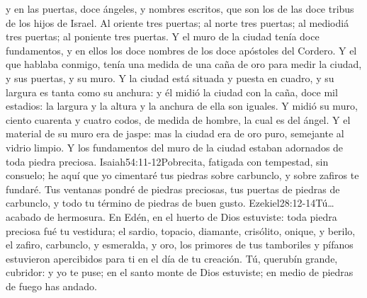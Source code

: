  y en las puertas, doce ángeles,%
 y nombres escritos, que son los de las doce tribus de los hijos de Israel.%
Al oriente tres puertas; al norte tres puertas; al mediodiá tres puertas; al poniente tres puertas.
Y el muro de la ciudad tenía doce fundamentos, y en ellos los doce nombres de los doce apóstoles del Cordero. 
Y el que hablaba conmigo, tenía una medida de una caña de oro para medir la ciudad, y sus puertas, y su muro.%
Y la ciudad está situada y puesta en cuadro, y su largura es tanta como su anchura:%
 y él midió la ciudad con la caña, doce mil estadios: la largura y la altura y la anchura de ella son iguales.%
Y midió su muro, ciento cuarenta y cuatro codos, de medida de hombre, la cual es del ángel. 
Y el material de su muro era de jaspe: mas la ciudad era de oro puro, semejante al vidrio limpio. 
Y los fundamentos del muro de la ciudad estaban adornados de toda piedra preciosa.%
				{Isaiah}{54:11-12}{Pobrecita, fatigada con tempestad, sin consuelo; he aquí que yo cimentaré tus piedras sobre carbunclo, y sobre zafiros te fundaré. Tus ventanas pondré de piedras preciosas, tus puertas de piedras de carbunclo, y todo tu término de piedras de buen gusto.}%
				{Ezekiel}{28:12-14}{Tú\ldots acabado de hermosura. En Edén, en el huerto de Dios estuviste: toda piedra preciosa fué tu vestidura; el sardio, topacio, diamante, crisólito, onique, y berilo, el zafiro, carbunclo, y esmeralda, y oro, los primores de tus tamboriles y pífanos estuvieron apercibidos para ti en el día de tu creación. Tú, querubín grande, cubridor: y yo te puse; en el santo monte de Dios estuviste; en medio de piedras de fuego has andado.} %
